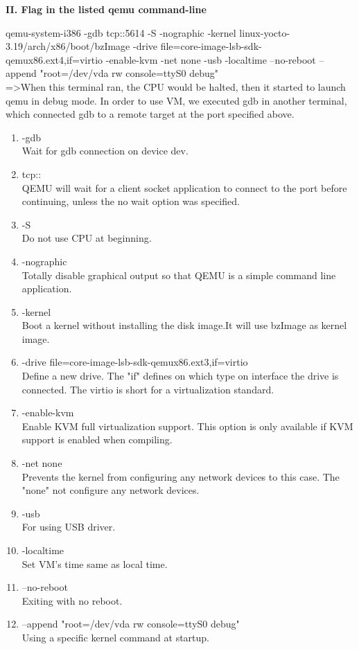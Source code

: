 \documentclass[english,10pt,letterpaper,onecolumn]{IEEEtran}
\begin{document}
\begin{center}
\begin{center}
{\bf II. Flag in the listed qemu command-line}
\end{center}
qemu-system-i386 -gdb tcp::5614 -S -nographic -kernel linux-yocto-3.19/arch/x86/boot/bzImage  -drive file=core-image-lsb-sdk-qemux86.ext4,if=virtio -enable-kvm -net none -usb -localtime --no-reboot --append "root=/dev/vda rw console=ttyS0 debug"\\
  =\textgreater When this terminal ran, the CPU would be halted, then it started to launch qemu in debug mode. In order to use VM, we executed gdb in another terminal, which connected gdb to a remote target at the port specified above.\\
  
\begin{enumerate}
   \item -gdb\\
   Wait for gdb connection on device dev.
   \item tcp::\\ 
   QEMU will wait for a client socket application to connect to the port before continuing, unless the no wait option was specified.
   \item-S\\ 
   Do not use CPU at beginning. 
   \item-nographic\\
   Totally disable graphical output so that QEMU is a simple command line application.
   \item-kernel\\
   Boot a kernel without installing the disk image.It will use bzImage as kernel image.
   \item-drive file=core-image-lsb-sdk-qemux86.ext3,if=virtio\\
   Define a new drive. The "if" defines on which type on interface the drive is connected. The virtio is short for a virtualization standard.
   \item-enable-kvm\\
   Enable KVM full virtualization support. This option is only available if KVM support is enabled when compiling. 
   \item-net none\\
   Prevents the kernel from configuring any network devices to this case. The "none" not configure any network devices.
   \item-usb\\ 
   For using USB driver.
   \item -localtime\\
   Set VM's time same as local time.
   \item --no-reboot \\
   Exiting with no reboot.
    \item --append "root=/dev/vda rw console=ttyS0 debug"\\
   Using a specific kernel command at startup.
  \end{enumerate}

\end{center}
\end{document}
